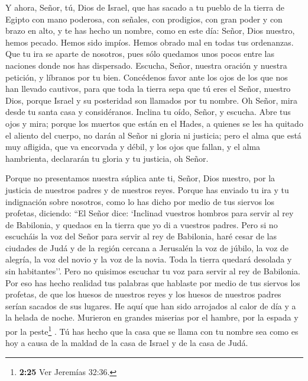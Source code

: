  Y ahora, Señor, tú, Dios de Israel, que has sacado a tu
pueblo de la tierra de Egipto con mano poderosa, con señales, con
prodigios, con gran poder y con brazo en alto, y te has hecho un nombre,
como en este día:  Señor, Dios nuestro, hemos pecado.
Hemos sido impíos. Hemos obrado mal en todas tus ordenanzas.
 Que tu ira se aparte de nosotros, pues sólo quedamos
unos pocos entre las naciones donde nos has dispersado. 
Escucha, Señor, nuestra oración y nuestra petición, y líbranos por tu
bien. Concédenos favor ante los ojos de los que nos han llevado
cautivos,  para que toda la tierra sepa que tú eres el
Señor, nuestro Dios, porque Israel y su posteridad son llamados por tu
nombre.  Oh Señor, mira desde tu santa casa y
considéranos. Inclina tu oído, Señor, y escucha.  Abre
tus ojos y mira; porque los muertos que están en el Hades, a quienes se
les ha quitado el aliento del cuerpo, no darán al Señor ni gloria ni
justicia;  pero el alma que está muy afligida, que va
encorvada y débil, y los ojos que fallan, y el alma hambrienta,
declararán tu gloria y tu justicia, oh Señor.

 Porque no presentamos nuestra súplica ante ti, Señor,
Dios nuestro, por la justicia de nuestros padres y de nuestros reyes.
 Porque has enviado tu ira y tu indignación sobre
nosotros, como lo has dicho por medio de tus siervos los profetas,
diciendo:  ``El Señor dice: `Inclinad vuestros hombros
para servir al rey de Babilonia, y quedaos en la tierra que yo di a
vuestros padres.  Pero si no escucháis la voz del Señor
para servir al rey de Babilonia,  haré cesar de las
ciudades de Judá y de la región cercana a Jerusalén la voz de júbilo, la
voz de alegría, la voz del novio y la voz de la novia. Toda la tierra
quedará desolada y sin habitantes''.  Pero no quisimos
escuchar tu voz para servir al rey de Babilonia. Por eso has hecho
realidad tus palabras que hablaste por medio de tus siervos los
profetas, de que los huesos de nuestros reyes y los huesos de nuestros
padres serían sacados de sus lugares.  He aquí que han
sido arrojados al calor de día y a la helada de noche. Murieron en
grandes miserias por el hambre, por la espada y por la peste\footnote{\textbf{2:25}
  Ver Jeremías 32:36.} .  Tú has hecho que la casa que se
llama con tu nombre sea como es hoy a causa de la maldad de la casa de
Israel y de la casa de Judá.


